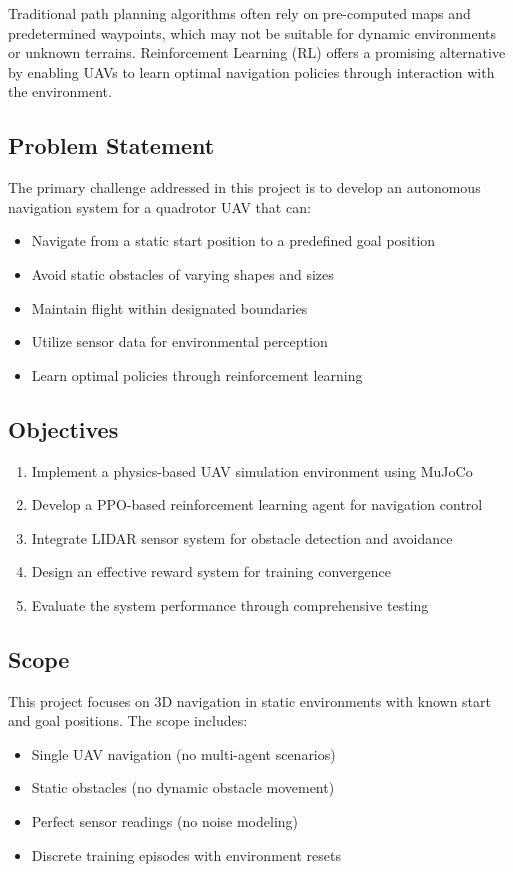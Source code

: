 \documentclass[12pt,a4paper]{article}
\begin{document}
Traditional path planning algorithms often rely on pre-computed maps and predetermined waypoints, which may not be suitable for dynamic environments or unknown terrains. Reinforcement Learning (RL) offers a promising alternative by enabling UAVs to learn optimal navigation policies through interaction with the environment.

\subsection{Problem Statement}
The primary challenge addressed in this project is to develop an autonomous navigation system for a quadrotor UAV that can:
\begin{itemize}
    \item Navigate from a static start position to a predefined goal position
    \item Avoid static obstacles of varying shapes and sizes
    \item Maintain flight within designated boundaries
    \item Utilize sensor data for environmental perception
    \item Learn optimal policies through reinforcement learning
\end{itemize}

\subsection{Objectives}
\begin{enumerate}
    \item Implement a physics-based UAV simulation environment using MuJoCo
    \item Develop a PPO-based reinforcement learning agent for navigation control
    \item Integrate LIDAR sensor system for obstacle detection and avoidance
    \item Design an effective reward system for training convergence
    \item Evaluate the system performance through comprehensive testing
\end{enumerate}

\subsection{Scope}
This project focuses on 3D navigation in static environments with known start and goal positions. The scope includes:
\begin{itemize}
    \item Single UAV navigation (no multi-agent scenarios)
    \item Static obstacles (no dynamic obstacle movement)
    \item Perfect sensor readings (no noise modeling)
    \item Discrete training episodes with environment resets
\end{itemize}
\end{document}
